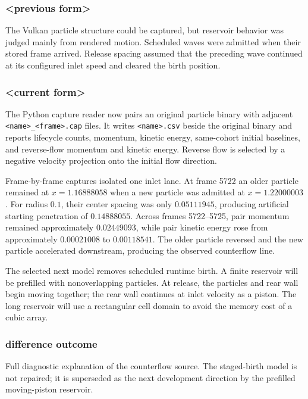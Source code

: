 \subsubsection{<previous form>}

The Vulkan particle structure could be captured, but reservoir behavior was
judged mainly from rendered motion.  Scheduled waves were admitted when their
stored frame arrived.  Release spacing assumed that the preceding wave
continued at its configured inlet speed and cleared the birth position.

\subsubsection{<current form>}

The Python capture reader now pairs an original particle binary with adjacent
\texttt{<name>\_<frame>.cap} files.  It writes \texttt{<name>.csv} beside the
original binary and reports lifecycle counts, momentum, kinetic energy,
same-cohort initial baselines, and reverse-flow momentum and kinetic energy.
Reverse flow is selected by a negative velocity projection onto the initial
flow direction.

Frame-by-frame captures isolated one inlet lane.  At frame 5722 an older
particle remained at $x=1.16888058$ when a new particle was admitted at
$x=1.22000003$.  For radius $0.1$, their center spacing was only
$0.05111945$, producing artificial starting penetration of $0.14888055$.
Across frames 5722--5725, pair momentum remained approximately $0.02449093$,
while pair kinetic energy rose from approximately $0.00021008$ to
$0.00118541$.  The older particle reversed and the new particle accelerated
downstream, producing the observed counterflow line.

The selected next model removes scheduled runtime birth.  A finite reservoir
will be prefilled with nonoverlapping particles.  At release, the particles
and rear wall begin moving together; the rear wall continues at inlet velocity
as a piston.  The long reservoir will use a rectangular cell domain to avoid
the memory cost of a cubic array.

\subsubsection{difference outcome}

Full diagnostic explanation of the counterflow source.  The staged-birth
model is not repaired; it is superseded as the next development direction by
the prefilled moving-piston reservoir.


